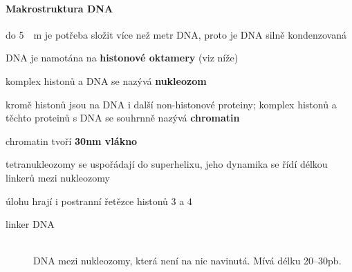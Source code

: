 \documentclass[DIV=8]{scrreprt}
\begin{document}
\paragraph{Makrostruktura DNA}
\begin{myItemize}[nosep]
    \item do \si{5 \mu m} je potřeba složit více než metr DNA, proto je DNA silně kondenzovaná
    \item DNA je namotána na \textbf{histonové oktamery} (viz níže)
\begin{myItemize}[nosep]
    \item komplex histonů a DNA se nazývá \textbf{nukleozom}
\end{myItemize}

    \item kromě histonů jsou na DNA i další non-histonové proteiny; komplex histonů a těchto proteinů s DNA se souhrnně nazývá \textbf{chromatin}
\begin{myItemize}[nosep]
    \item chromatin tvoří \textbf{30nm vlákno}
    \item tetranukleozomy se uspořádají do superhelixu, jeho dynamika se řídí délkou linkerů mezi nukleozomy
\begin{myItemize}[nosep]
    \item úlohu hrají i postranní řetězce histonů 3 a 4
\end{myItemize}

\end{myItemize}

\end{myItemize}



\begin{description}
\item[linker DNA]\hfill \\
DNA mezi nukleozomy, která není na nic navinutá. Mívá délku 20--30pb.

\end{description}
\end{document}
